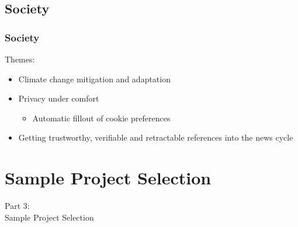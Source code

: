 \subsection{Society}
\begin{frame}
    \frametitle{Society}
    \vspace{3mm}
    Themes:
    \begin{itemize}
        \item Climate change mitigation and adaptation
        \item Privacy under comfort
          \begin{itemize}
            \item Automatic fillout of cookie preferences
          \end{itemize}
        \item Getting trustworthy, verifiable and retractable references into the news cycle
    \end{itemize}
\end{frame}

\section{Sample Project Selection}
\begin{frame}
    \vspace{25mm}
    \begin{center}
        \Huge{Part 3:\\Sample Project Selection}
    \end{center}
\end{frame}

